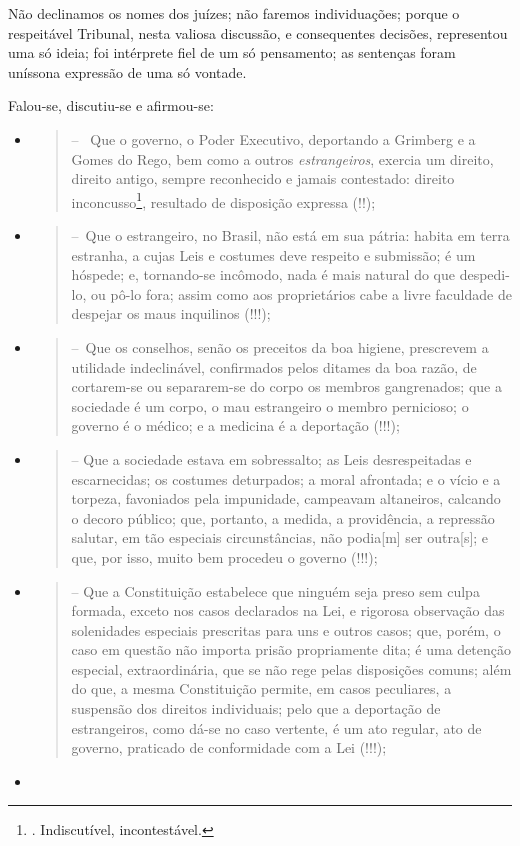 Não declinamos os nomes dos juízes; não faremos individuações; porque o
respeitável Tribunal, nesta valiosa discussão, e consequentes decisões,
representou uma só ideia; foi intérprete fiel de um só pensamento; as
sentenças foram uníssona expressão de uma só vontade.

Falou-se, discutiu-se e afirmou-se:

\begin{itemize}
\item
  \begin{quote}
  -- ~Que o governo, o Poder Executivo, deportando a Grimberg e a Gomes
  do Rego, bem como a outros \emph{estrangeiros}, exercia um direito,
  direito antigo, sempre reconhecido e jamais contestado: direito
  inconcusso\footnote{. Indiscutível, incontestável.}, resultado de
  disposição expressa (!!);
  \end{quote}
\item
  \begin{quote}
  --~Que o estrangeiro, no Brasil, não está em sua pátria: habita em
  terra estranha, a cujas Leis e costumes deve respeito e submissão; é
  um hóspede; e, tornando-se incômodo, nada é mais natural do que
  despedi-lo, ou pô-lo fora; assim como aos proprietários cabe a livre
  faculdade de despejar os maus inquilinos (!!!);
  \end{quote}
\item
  \begin{quote}
  --~Que os conselhos, senão os preceitos da boa higiene, prescrevem a
  utilidade indeclinável, confirmados pelos ditames da boa razão, de
  cortarem-se ou separarem-se do corpo os membros gangrenados; que a
  sociedade é um corpo, o mau estrangeiro o membro pernicioso; o governo
  é o médico; e a medicina é a deportação (!!!);
  \end{quote}
\item
  \begin{quote}
  -- Que a sociedade estava em sobressalto; as Leis desrespeitadas e
  escarnecidas; os costumes deturpados; a moral afrontada; e o vício e a
  torpeza, favoniados pela impunidade, campeavam altaneiros, calcando o
  decoro público; que, portanto, a medida, a providência, a repressão
  salutar, em tão especiais circunstâncias, não podia{[}m{]} ser
  outra{[}s{]}; e que, por isso, muito bem procedeu o governo (!!!);
  \end{quote}
\item
  \begin{quote}
  -- Que a Constituição estabelece que ninguém seja preso sem culpa
  formada, exceto nos casos declarados na Lei, e rigorosa observação das
  solenidades especiais prescritas para uns e outros casos; que, porém,
  o caso em questão não importa prisão propriamente dita; é uma detenção
  especial, extraordinária, que se não rege pelas disposições comuns;
  além do que, a mesma Constituição permite, em casos peculiares, a
  suspensão dos direitos individuais; pelo que a deportação de
  estrangeiros, como dá-se no caso vertente, é um ato regular, ato de
  governo, praticado de conformidade com a Lei (!!!);
  \end{quote}
\item
\end{itemize}

